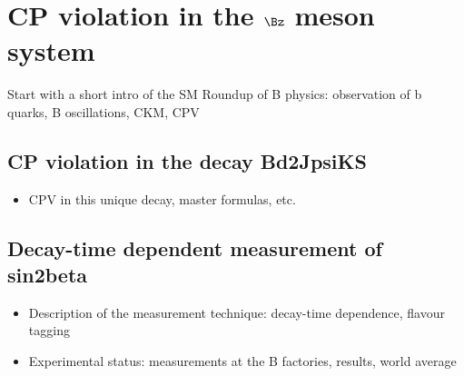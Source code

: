 
\chapter{CP violation in the $\Bz$ meson system}
\label{ch:cpv_theory}

Start with a short intro of the SM
Roundup of B physics: observation of b quarks, B oscillations, CKM, CPV





\section{CP violation in the decay Bd2JpsiKS}
\begin{itemize}
  \item CPV in this unique decay, master formulas, etc.
\end{itemize}

\section{Decay-time dependent measurement of sin2beta}
\begin{itemize}
  \item Description of the measurement technique: decay-time dependence, flavour tagging
  \item Experimental status: measurements at the B factories, results, world average
\end{itemize}
